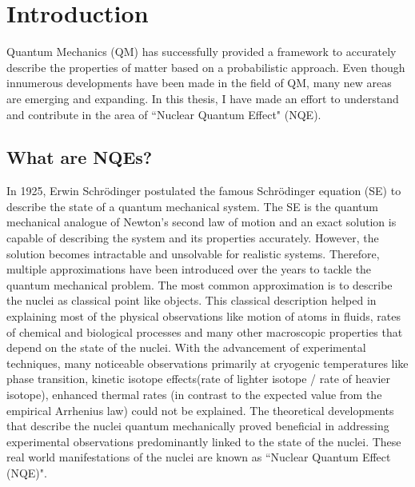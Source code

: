 \chapter{Introduction}\label{introduction}
\graphicspath{{Introduction/Figures/}}

Quantum Mechanics (QM) has successfully provided a framework to accurately describe the properties of matter based on a probabilistic approach. Even though innumerous developments have been made in the field of QM, many new areas are emerging and expanding. In this thesis, I have made an effort to understand  and contribute in the area of ``Nuclear Quantum Effect" (NQE).

\section {What are NQEs?}
In 1925, Erwin Schr\"{o}dinger postulated the famous Schr\"{o}dinger equation (SE) to describe the state of a quantum mechanical system. The SE is the quantum mechanical analogue of Newton's second law of motion and  an exact solution is capable of describing the system and its properties accurately. However, the solution becomes intractable and unsolvable for realistic systems. Therefore, multiple approximations have been introduced over the years to tackle the quantum mechanical problem. The most common approximation is to describe the nuclei as classical point like objects. This classical description helped in explaining most of the physical observations like motion of atoms in fluids, rates of chemical and biological processes and many other macroscopic properties that depend on the state of the nuclei. With the advancement of experimental techniques, many noticeable observations primarily at cryogenic temperatures like phase transition\cite{horiuchi2008organic}, kinetic isotope effects\cite{truong2021large}(rate of lighter isotope / rate of heavier isotope), enhanced thermal rates\cite{zuev2003carbon} (in contrast to the expected value from the empirical Arrhenius law) could not be explained. The theoretical developments that describe the nuclei quantum mechanically proved beneficial in addressing experimental observations predominantly linked to the state of the nuclei.  These real world manifestations of the nuclei are known as ``Nuclear Quantum Effect (NQE)". 

